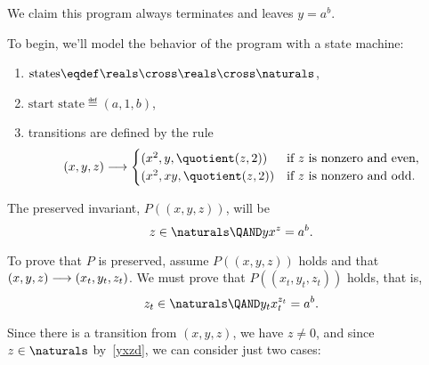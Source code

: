 
We claim this program always terminates and leaves $y = a^b$.

To begin, we'll model the behavior of the program with a state
machine:
\begin{enumerate}
\item $\text{states} \eqdef \reals \cross \reals \cross \naturals$,
\item $\text{start state} \eqdef (a,1,b)$,
\item transitions are defined by the rule
\begin{equation*}
(x,y,z) \movesto
\begin{cases}
(x^2, y, \quotient(z,2)) & \text{if $z$ is nonzero and even},\\
(x^2, xy, \quotient(z,2)) & \text{if $z$ is nonzero and odd}.
\end{cases}
\end{equation*}
\end{enumerate}

The preserved invariant, $P((x,y,z))$, will be
\begin{equation}\label{yxzd}
z \in \naturals \QAND yx^z = a^b.
\end{equation}

To prove that $P$ is preserved, assume $P((x,y,z))$ holds
and that $(x,y,z) \mathrel{\longrightarrow} (x_t,y_t,z_t)$.  We must prove that
$P((x_t,y_t,z_t))$ holds, that is,
\begin{equation}\label{ztytxt}
z_t \in \naturals \QAND y_tx_t^{z_t} = a^b.
\end{equation}

Since there is a transition from $(x,y,z)$, we have $z \neq 0$, and since
$z \in \naturals$ by~\eqref{yxzd}, we can consider just two cases:

